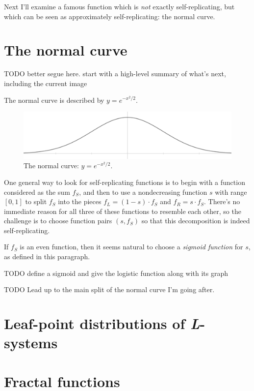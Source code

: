 \documentclass[20pt,]{extarticle}
\begin{document}
Next I'll examine a famous function which is \emph{not} exactly
self-replicating, but which can be seen as approximately
self-replicating: the normal curve.

\section{The normal curve}\label{the-normal-curve}

TODO better segue here. start with a high-level summary of what's next,
including the current image

The normal curve is described by \(y = e^{-x^2/2}\).

\begin{figure}[htbp]
\centering
\includegraphics{images/normal3.png}
\caption{The normal curve: \(y=e^{-x^2/2}\).}
\end{figure}

One general way to look for self-replicating functions is to begin with
a function considered as the sum \(f_S\), and then to use a
nondecreasing function \(s\) with range \([0,1]\) to split \(f_S\) into
the pieces \(f_L = (1 - s)\cdot f_S\) and \(f_R = s\cdot f_S\). There's
no immediate reason for all three of these functions to resemble each
other, so the challenge is to choose function pairs \((s, f_S)\) so that
this decomposition is indeed self-replicating.

If \(f_S\) is an even function, then it seems natural to choose a
\emph{sigmoid function} for \(s\), as defined in this paragraph.

TODO define a sigmoid and give the logistic function along with its
graph

TODO Lead up to the main split of the normal curve I'm going after.

\section{\texorpdfstring{Leaf-point distributions of
\emph{L}-systems}{Leaf-point distributions of L-systems}}\label{leaf-point-distributions-of-l-systems}

\section{Fractal functions}\label{fractal-functions}
\end{document}

